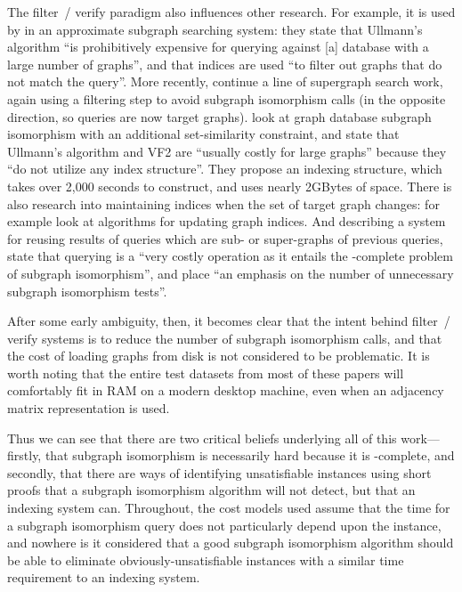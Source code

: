 \documentclass[twoside,11pt]{article}
\begin{document}
The filter~/ verify paradigm also influences other research. For example, it is used by
 in an approximate subgraph searching system: they state that
Ullmann's algorithm ``is prohibitively expensive for querying against [a] database with a large
number of graphs'', and that indices are used ``to filter out graphs that do not match the query''.
More recently,  continue a line of supergraph search work, again
using a filtering step to avoid subgraph isomorphism calls (in the opposite direction, so queries
are now target graphs).  look at graph database subgraph
isomorphism with an additional set-similarity constraint, and state that Ullmann's algorithm and VF2
are ``usually costly for large graphs'' because they ``do not utilize any index structure''. They
propose an indexing structure, which takes over 2,000 seconds to construct, and uses nearly 2GBytes
of space.  There is also research into maintaining indices when the set of target graph changes: for
example  look at algorithms for updating graph indices.
And describing a system for reusing results of queries which are sub- or super-graphs of previous
queries,  state that querying is a ``very costly operation as it
entails the \NP-complete problem of subgraph isomorphism'', and place ``an emphasis on the number of
unnecessary subgraph isomorphism tests''.

After some early ambiguity, then, it becomes clear that the intent behind filter~/ verify systems is
to reduce the number of subgraph isomorphism calls, and that the cost of loading graphs from disk is
not considered to be problematic. It is worth noting that the entire test datasets from most of
these papers will comfortably fit in RAM on a modern desktop machine, even when an adjacency matrix
representation is used.

Thus we can see that there are two critical beliefs underlying all of this work---firstly, that
subgraph isomorphism is necessarily hard because it is \NP-complete, and secondly, that there are
ways of identifying unsatisfiable instances using short proofs that a subgraph isomorphism algorithm
will not detect, but that an indexing system can. Throughout, the cost models used assume that the
time for a subgraph isomorphism query does not particularly depend upon the instance, and nowhere is
it considered that a good subgraph isomorphism algorithm should be able to eliminate
obviously-unsatisfiable instances with a similar time requirement to an indexing system.
\end{document}
